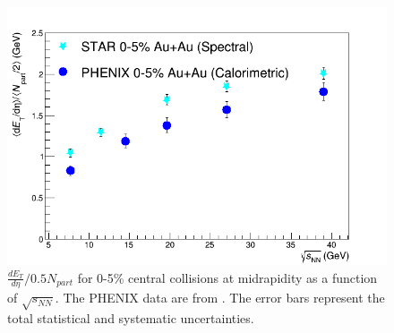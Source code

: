 	\begin{figure}[h]
	  \centering
	  \includegraphics[width=4.5in]{figures/PHENIX_comparison2.png}
	  \caption{$\frac{dE_{T}}{d\eta}/0.5N_{part}$ for 0-5\% central collisions at midrapidity as a function of $\sqrt{s_{NN}}$. The PHENIX data are from \cite{PhysRevC.93.024901}. The error bars represent the total statistical and systematic uncertainties.}\label{fig:comparison}
	\end{figure}
	
	
	
